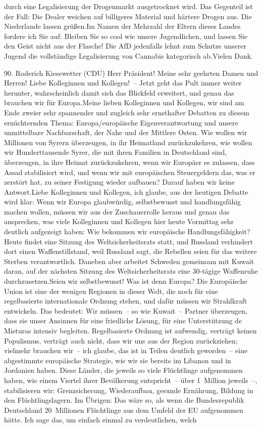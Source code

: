 \documentclass{article}
\begin{document}
durch eine Legalisierung der Drogenmarkt ausgetrocknet wird. Das Gegenteil ist der Fall: Die Dealer weichen auf billigeres Material und härtere Drogen aus. Die Niederlande lassen grüßen.Im Namen der Mehrzahl der Eltern dieses Landes fordere ich Sie auf: Bleiben Sie so cool wie unsere Jugendlichen, und lassen Sie den Geist nicht aus der Flasche! Die AfD jedenfalls lehnt zum Schutze unserer Jugend die vollständige Legalisierung von Cannabis kategorisch ab.Vielen Dank.




	90. Roderich Kiesewetter (CDU) Herr Präsident! Meine sehr geehrten Damen und Herren! Liebe Kolleginnen und Kollegen! – Jetzt geht das Pult immer weiter herunter, wahrscheinlich damit sich das Blickfeld erweitert, und genau das brauchen wir für Europa.Meine lieben Kolleginnen und Kollegen, wir sind am Ende zweier sehr spannender und zugleich sehr ernsthafter Debatten zu diesem ernüchternden Thema: Europa/europäische Eigenverantwortung und unsere unmittelbare Nachbarschaft, der Nahe und der Mittlere Osten. Wie wollen wir Millionen von Syrern überzeugen, in ihr Heimatland zurückzukehren, wie wollen wir Hunderttausende Syrer, die mit ihren Familien in Deutschland sind, überzeugen, in ihre Heimat zurückzukehren, wenn wir Europäer es zulassen, dass Assad stabilisiert wird, und wenn wir mit europäischen Steuergeldern das, was er zerstört hat, zu seiner Festigung wieder aufbauen? Darauf haben wir keine Antwort.Liebe Kolleginnen und Kollegen, ich glaube, aus der heutigen Debatte wird klar: Wenn wir Europa glaubwürdig, selbstbewusst und handlungsfähig machen wollen, müssen wir aus der Zuschauerrolle heraus und genau das ansprechen, was viele Kolleginnen und Kollegen hier heute Vormittag sehr deutlich aufgezeigt haben: Wie bekommen wir europäische Handlungsfähigkeit?Heute findet eine Sitzung des Weltsicherheitsrats statt, und Russland verhindert dort einen Waffenstillstand, weil Russland sagt, die Rebellen seien für das weitere Sterben verantwortlich. Daneben aber arbeitet Schweden gemeinsam mit Kuwait daran, auf der nächsten Sitzung des Weltsicherheitsrats eine 30-tägige Waffenruhe durchzusetzen.Seien wir selbstbewusst! Was ist denn Europa? Die Europäische Union ist eine der wenigen Regionen in dieser Welt, die noch für eine regelbasierte internationale Ordnung stehen, und dafür müssen wir Strahlkraft entwickeln. Das bedeutet: Wir müssen – so wie Kuwait – Partner überzeugen, dass sie unser Ansinnen für eine friedliche Lösung, für eine Unterstützung de Misturas intensiv begleiten. Regelbasierte Ordnung ist aufwendig, verträgt keinen Populismus, verträgt auch nicht, dass wir uns aus der Region zurückziehen; vielmehr brauchen wir – ich glaube, das ist in Teilen deutlich geworden – eine abgestimmte europäische Strategie, wie wir sie bereits im Libanon und in Jordanien haben. Diese Länder, die jeweils so viele Flüchtlinge aufgenommen haben, wie einem Viertel ihrer Bevölkerung entspricht – über 1 Million jeweils –, stabilisieren wir: Grenzsicherung, Wiederaufbau, gesunde Ernährung, Bildung in den Flüchtlingslagern. Im Übrigen: Das wäre so, als wenn die Bundesrepublik Deutschland 20 Millionen Flüchtlinge aus dem Umfeld der EU aufgenommen hätte. Ich sage das, um einfach einmal zu verdeutlichen, welch 
\end{document}
